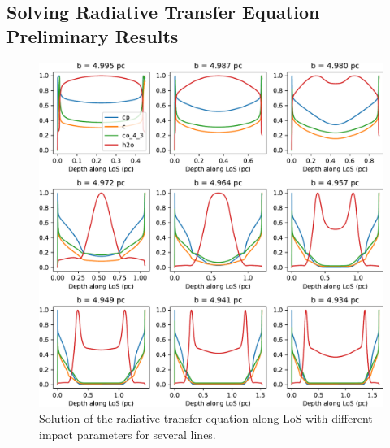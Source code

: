\documentclass[12pt,a4paper]{article}
\begin{document}
\subsection*{Solving Radiative Transfer Equation Preliminary Results}
\begin{figure}[h]
    \centering
    \includegraphics[width=\textwidth,keepaspectratio]{rte_comparison.pdf}
    \caption{Solution of the radiative transfer equation along LoS with different impact parameters for several lines.} \label{fig:rtecomp}
\end{figure}
\end{document}
